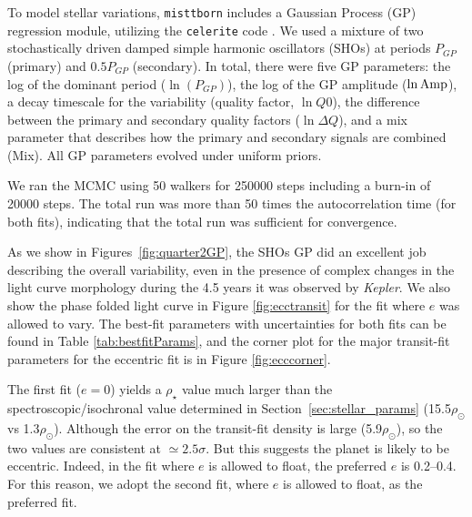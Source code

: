 \documentclass[twocolumn]{aastex631}
\newcommand{\kepler}{{\it Kepler}}
\begin{document}
To model stellar variations, \texttt{misttborn} includes a Gaussian Process (GP) regression module, utilizing the \texttt{celerite} code \citep{celerite}. We used a mixture of two stochastically driven damped simple harmonic oscillators (SHOs) at periods $P_{GP}$ (primary) and $0.5P_{GP}$ (secondary). In total, there were five GP parameters: the log of the dominant period ($\ln(P_{GP})$), the log of the GP amplitude ($\ln{\rm{Amp}}$), a decay timescale for the variability (quality factor, $\ln{Q0}$), the difference between the primary and secondary quality factors ($\ln{\Delta Q}$), and a mix parameter that describes how the primary and secondary signals are combined (Mix). All GP parameters evolved under uniform priors. 

We ran the MCMC using 50 walkers for 250000 steps including a burn-in of 20000 steps. The total run was more than 50 times the autocorrelation time (for both fits), indicating that the total run was sufficient for convergence.

As we show in Figures~\ref{fig:quarter2GP}, the SHOs GP did an excellent job describing the overall variability, even in the presence of complex changes in the light curve morphology during the 4.5 years it was observed by \kepler. We also show the phase folded light curve in Figure \ref{fig:ecctransit} for the fit where $e$ was allowed to vary. The best-fit parameters with uncertainties for both fits can be found in Table \ref{tab:bestfitParams}, and the corner plot for the major transit-fit parameters for the eccentric fit is in Figure \ref{fig:ecccorner}. 

The first fit ($e=0$) yields a $\rho_{\star}$ value much larger than the spectroscopic/isochronal value determined in Section~\ref{sec:stellar_params} (15.5$\rho_\odot$ vs 1.3$\rho_\odot$). Although the error on the transit-fit density is large (5.9$\rho_\odot$), so the two values are consistent at $\simeq2.5\sigma$. But this suggests the planet is likely to be eccentric. Indeed, in the fit where $e$ is allowed to float, the preferred $e$ is 0.2--0.4. For this reason, we adopt the second fit, where $e$ is allowed to float, as the preferred fit.  
\end{document}
